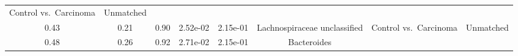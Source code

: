 \documentclass[12pt,]{article}
\begin{document}
\begin{longtable}[]{@{}cccccccc@{}}
\begin{minipage}[t]{0.14\columnwidth}
Control vs.~Carcinoma\strut
\end{minipage} & \begin{minipage}[t]{0.09\columnwidth}\centering\strut
Unmatched\strut
\end{minipage}\tabularnewline
\begin{minipage}[t]{0.05\columnwidth}\centering\strut
0.43\strut
\end{minipage} & \begin{minipage}[t]{0.09\columnwidth}\centering\strut
0.21\strut
\end{minipage} & \begin{minipage}[t]{0.09\columnwidth}\centering\strut
0.90\strut
\end{minipage} & \begin{minipage}[t]{0.07\columnwidth}\centering\strut
2.52e-02\strut
\end{minipage} & \begin{minipage}[t]{0.07\columnwidth}\centering\strut
2.15e-01\strut
\end{minipage} & \begin{minipage}[t]{0.20\columnwidth}\centering\strut
Lachnospiraceae unclassified\strut
\end{minipage} & \begin{minipage}[t]{0.14\columnwidth}\centering\strut
Control vs.~Carcinoma\strut
\end{minipage} & \begin{minipage}[t]{0.09\columnwidth}\centering\strut
Unmatched\strut
\end{minipage}\tabularnewline
\begin{minipage}[t]{0.05\columnwidth}\centering\strut
0.48\strut
\end{minipage} & \begin{minipage}[t]{0.09\columnwidth}\centering\strut
0.26\strut
\end{minipage} & \begin{minipage}[t]{0.09\columnwidth}\centering\strut
0.92\strut
\end{minipage} & \begin{minipage}[t]{0.07\columnwidth}\centering\strut
2.71e-02\strut
\end{minipage} & \begin{minipage}[t]{0.07\columnwidth}\centering\strut
2.15e-01\strut
\end{minipage} & \begin{minipage}[t]{0.20\columnwidth}\centering\strut
Bacteroides\strut
\end{minipage} & \begin{minipage}[t]{0.14\columnwidth}\centering\strut

\end{minipage}
\end{longtable}
\end{document}

